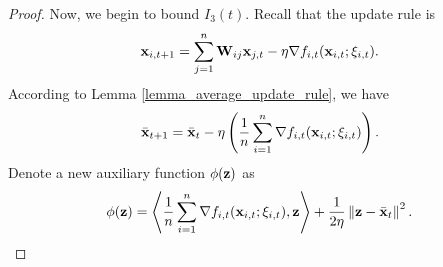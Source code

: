 \documentclass{article}
\begin{document}
\begin{proof}
Now, we begin to bound $I_3(t)$. Recall that the update rule is 
\begin{align}
\nonumber
{\bf x}_{i,t+1} = \sum_{j=1}^n {\bf W}_{ij}{\bf x}_{j,t} - \eta \nabla f_{i,t}({\bf x}_{i,t};\xi_{i,t}).
\end{align}  According to Lemma \ref{lemma_average_update_rule}, we have 
\begin{align}
\label{equa_thoerem_update_rule_equivalent}
\bar{{\bf x}}_{t+1} = \bar{{\bf x}}_t - \eta \left( \frac{1}{n}\sum_{i=1}^n \nabla f_{i,t}({\bf x}_{i,t};\xi_{i,t}) \right).
\end{align} 
Denote a new auxiliary function $\phi({\bf z})$ as 
\begin{align}
\nonumber
\phi({\bf z}) = \left\langle\frac{1}{n}\sum_{i=1}^n \nabla f_{i,t}({\bf x}_{i,t};\xi_{i,t}), {\bf z} \right\rangle + \frac{1}{2\eta}\left\lVert{\bf z} - \bar{{\bf x}}_t\right\rVert^2.
\end{align} 


\end{proof}
\end{document}
